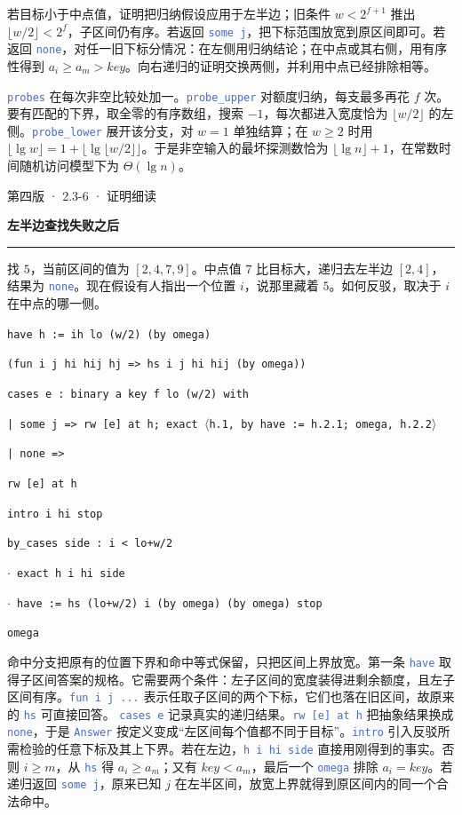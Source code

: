 \documentclass[UTF8,11pt,a4paper,fontset=fandol]{ctexart}
\newcommand{\HandoutLesson}[2]{%
  \par{\small\heiti\color{BrickRed}#1}\par\vspace{3pt}
  {\fontsize{21}{27}\selectfont\heiti\bfseries #2}\par
  \textcolor{BrickRed}{\rule{\linewidth}{.7pt}}\par}
\newcommand{\src}[1]{\textcolor{RoyalBlue}{\texttt{#1}}}
\newcommand{\subhead}[1]{\par\vspace{3pt}{\heiti\bfseries\color{RoyalBlue}#1}\par}
\newenvironment{leanblock}{\par\smallskip\noindent\begin{lrbox}{\leanbox}\begin{minipage}{\dimexpr\linewidth-12pt\relax}\raggedright\small\setlength{\parskip}{0pt}}{\end{minipage}\end{lrbox}\colorbox{RoyalBlue!6}{\usebox{\leanbox}}\par\smallskip}
\newcommand{\lineofcode}[2]{\noindent\hspace*{#1em}\strut\texttt{#2}\par}
\begin{document}
若目标小于中点值，证明把归纳假设应用于左半边；旧条件 $w<2^{f+1}$ 推出 $\lfloor w/2\rfloor<2^f$，子区间仍有序。若返回 \src{some j}，把下标范围放宽到原区间即可。若返回 \src{none}，对任一旧下标分情况：在左侧用归纳结论；在中点或其右侧，用有序性得到 $a_i\ge a_m>key$。向右递归的证明交换两侧，并利用中点已经排除相等。
\subhead{为什么是紧确的对数界}
\src{probes} 在每次非空比较处加一。\src{probe\_upper} 对额度归纳，每支最多再花 $f$ 次。要有匹配的下界，取全零的有序数组，搜索 $-1$，每次都进入宽度恰为 $\lfloor w/2\rfloor$ 的左侧。\src{probe\_lower} 展开该分支，对 $w=1$ 单独结算；在 $w\ge2$ 时用 $\lfloor\lg w\rfloor=1+\lfloor\lg\lfloor w/2\rfloor\rfloor$。于是非空输入的最坏探测数恰为 $\lfloor\lg n\rfloor+1$，在常数时间随机访问模型下为 $\Theta(\lg n)$。
\par{}
\clearpage{}\label{p37}\HandoutLesson{第四版 · 2.3-6 · 证明细读}{左半边查找失败之后}
找 $5$，当前区间的值为 $[2,4,7,9]$。中点值 $7$ 比目标大，递归去左半边 $[2,4]$，结果为 \src{none}。现在假设有人指出一个位置 $i$，说那里藏着 $5$。如何反驳，取决于 $i$ 在中点的哪一侧。
\begin{leanblock}
\lineofcode{0.0}{have h := ih lo (w/2) (by omega)}
\lineofcode{0.9}{(fun i j hi hij hj => hs i j hi hij (by omega))}
\lineofcode{0.0}{cases e : binary a key f lo (w/2) with}
\lineofcode{0.0}{| some j => rw [e] at h; exact \ensuremath{\langle}h.1, by have := h.2.1; omega, h.2.2\ensuremath{\rangle}}
\lineofcode{0.0}{| none =>}
\lineofcode{0.9}{rw [e] at h}
\lineofcode{0.9}{intro i hi stop}
\lineofcode{0.9}{by\_cases side : i < lo+w/2}
\lineofcode{0.9}{\ensuremath{\cdot} exact h i hi side}
\lineofcode{0.9}{\ensuremath{\cdot} have := hs (lo+w/2) i (by omega) (by omega) stop}
\lineofcode{1.8}{omega}
\end{leanblock}
命中分支把原有的位置下界和命中等式保留，只把区间上界放宽。第一条 \src{have} 取得子区间答案的规格。它需要两个条件：左子区间的宽度装得进剩余额度，且左子区间有序。\src{fun i j ...} 表示任取子区间的两个下标，它们也落在旧区间，故原来的 \src{hs} 可直接回答。
\src{cases e} 记录真实的递归结果。\src{rw [e] at h} 把抽象结果换成 \src{none}，于是 \src{Answer} 按定义变成“左区间每个值都不同于目标”。\src{intro} 引入反驳所需检验的任意下标及其上下界。若在左边，\src{h i hi side} 直接用刚得到的事实。否则 $i\ge m$，从 \src{hs} 得 $a_i\ge a_m$；又有 $key<a_m$，最后一个 \src{omega} 排除 $a_i=key$。若递归返回 \src{some j}，原来已知 $j$ 在左半区间，放宽上界就得到原区间内的同一个合法命中。
\end{document}
